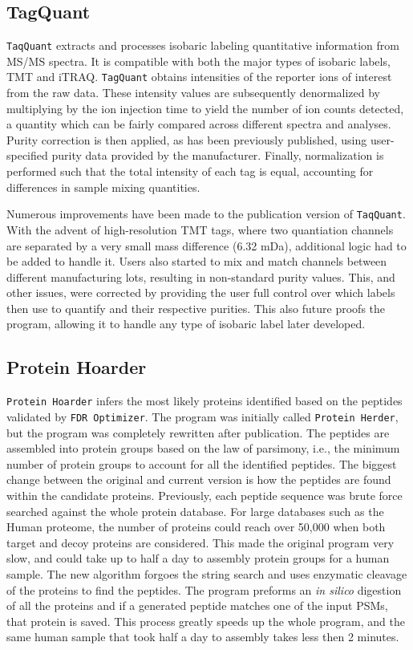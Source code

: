 \subsection*{TagQuant}
\texttt{TaqQuant} extracts and processes isobaric labeling quantitative information from MS/MS spectra. It is compatible with both the major types of isobaric labels, TMT and iTRAQ. \texttt{TagQuant} obtains intensities of the reporter ions of interest from the raw data. These intensity values are subsequently denormalized by multiplying by the ion injection time to yield the number of ion counts detected, a quantity which can be fairly compared across different spectra and analyses. Purity correction is then applied, as has been previously published,\cite{itracker} using user-specified purity data provided by the manufacturer. Finally, normalization is performed such that the total intensity of each tag is equal, accounting for differences in sample mixing quantities.

Numerous improvements have been made to the publication version of \texttt{TaqQuant}. With the advent of high-resolution TMT tags, where two quantiation channels are separated by a very small mass difference (6.32 mDa), additional logic had to be added to handle it. Users also started to mix and match channels between different manufacturing lots, resulting in non-standard purity values. This, and other issues, were corrected by providing the user full control over which labels then use to quantify and their respective purities. This also future proofs the program, allowing it to handle any type of isobaric label later developed.

\subsection*{Protein Hoarder}
\texttt{Protein Hoarder} infers the most likely proteins identified based on the peptides validated by \texttt{FDR Optimizer}. The program was initially called \texttt{Protein Herder}, but the program was completely rewritten after publication. 
The peptides are assembled into protein groups based on the law of parsimony, i.e., the minimum number of protein groups to account for all the identified peptides. The biggest change between the original and current version is how the peptides are found within the candidate proteins. Previously, each peptide sequence was brute force searched against the whole protein database. For large databases such as the Human proteome, the number of proteins could reach over 50,000 when both target and decoy proteins are considered. This made the original program very slow, and could take up to half a day to assembly protein groups for a human sample. The new algorithm forgoes the string search and uses enzymatic cleavage of the proteins to find the peptides. The program preforms an \emph{in silico} digestion of all the proteins and if a generated peptide matches one of the input PSMs, that protein is saved. This process greatly speeds up the whole program, and the same human sample that took half a day to assembly takes less then 2 minutes. 

